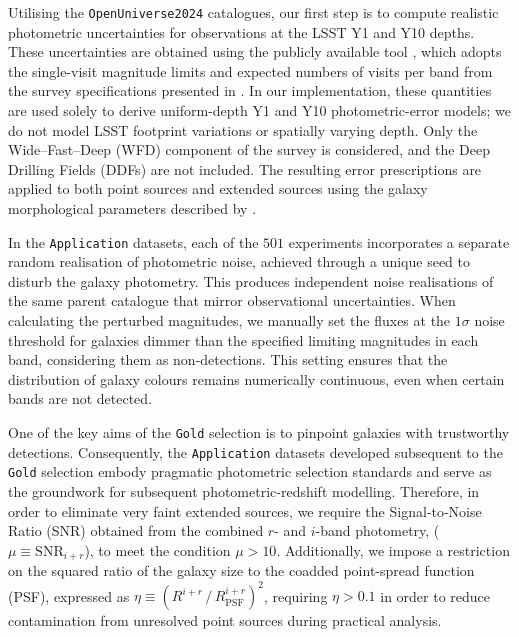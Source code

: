 Utilising the \texttt{OpenUniverse2024} catalogues, our first step is to compute realistic photometric uncertainties for observations at the LSST Y1 and Y10 depths. These uncertainties are obtained using the publicly available tool \citep[\href{https://github.com/jfcrenshaw/photerr}{\faGithub\,\texttt{PhotErr}};][]{2024AJ....168...80C}, which adopts the single-visit magnitude limits and expected numbers of visits per band from the survey specifications presented in \citet{2019ApJ...873..111I}. In our implementation, these quantities are used solely to derive uniform-depth Y1 and Y10 photometric-error models; we do not model LSST footprint variations or spatially varying depth. Only the Wide–Fast–Deep (WFD) component of the survey is considered, and the Deep Drilling Fields (DDFs) are not included. The resulting error prescriptions are applied to both point sources and extended sources using the galaxy morphological parameters described by \citet{2020A&A...642A.200V}.

In the \texttt{Application} datasets, each of the \(501\) experiments incorporates a separate random realisation of photometric noise, achieved through a unique seed to disturb the galaxy photometry. This produces independent noise realisations of the same parent catalogue that mirror observational uncertainties. When calculating the perturbed magnitudes, we manually set the fluxes at the \(1 \sigma\) noise threshold for galaxies dimmer than the specified limiting magnitudes in each band, considering them as non-detections. This setting ensures that the distribution of galaxy colours remains numerically continuous, even when certain bands are not detected.

One of the key aims of the \texttt{Gold} selection is to pinpoint galaxies with trustworthy detections. Consequently, the \texttt{Application} datasets developed subsequent to the \texttt{Gold} selection embody pragmatic photometric selection standards and serve as the groundwork for subsequent photometric-redshift modelling. Therefore, in order to eliminate very faint extended sources, we require the Signal‐to‐Noise Ratio (SNR) obtained from the combined \(r\)- and \(i\)-band photometry, (\(\mu \equiv \mathrm{SNR}_{i + r}\)), to meet the condition \(\mu > 10\). Additionally, we impose a restriction on the squared ratio of the galaxy size to the coadded point-spread function (PSF), expressed as \(\eta \equiv \left( R^{i + r} \,/\, R_{\mathrm{PSF}}^{i + r} \right)^2\), requiring \(\eta > 0.1\) in order to reduce contamination from unresolved point sources during practical analysis.

